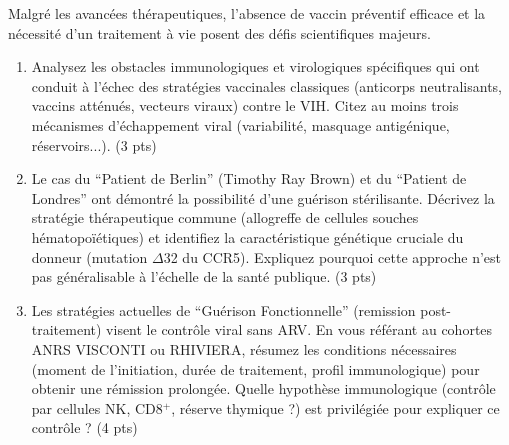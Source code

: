 \documentclass[11pt]{article}
\begin{document}
\begin{exercice}
Malgré les avancées thérapeutiques, l'absence de vaccin préventif efficace et la nécessité d'un traitement à vie posent des défis scientifiques majeurs.
\begin{enumerate}
    \item Analysez les obstacles immunologiques et virologiques spécifiques qui ont conduit à l'échec des stratégies vaccinales classiques (anticorps neutralisants, vaccins atténués, vecteurs viraux) contre le VIH. Citez au moins trois mécanismes d'échappement viral (variabilité, masquage antigénique, réservoirs...). (3 pts)
    \item Le cas du ``Patient de Berlin'' (Timothy Ray Brown) et du ``Patient de Londres'' ont démontré la possibilité d'une guérison stérilisante. Décrivez la stratégie thérapeutique commune (allogreffe de cellules souches hématopoïétiques) et identifiez la caractéristique génétique cruciale du donneur (mutation $\Delta$32 du CCR5). Expliquez pourquoi cette approche n'est pas généralisable à l'échelle de la santé publique. (3 pts)
    \item Les stratégies actuelles de ``Guérison Fonctionnelle'' (remission post-traitement) visent le contrôle viral sans ARV. En vous référant au cohortes ANRS VISCONTI ou RHIVIERA, résumez les conditions nécessaires (moment de l'initiation, durée de traitement, profil immunologique) pour obtenir une rémission prolongée. Quelle hypothèse immunologique (contrôle par cellules NK, CD8$^+$, réserve thymique ?) est privilégiée pour expliquer ce contrôle ? (4 pts)
\end{enumerate}
\end{exercice}
\end{document}
